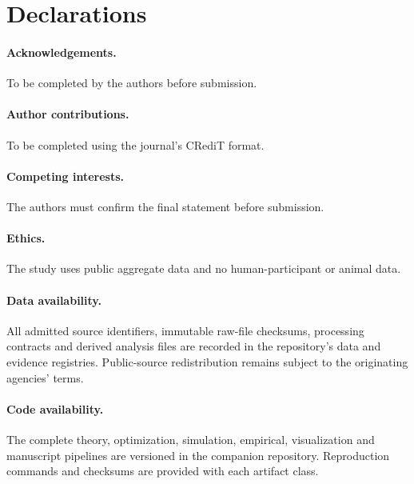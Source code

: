 \section*{Declarations}
\paragraph{Acknowledgements.} To be completed by the authors before submission.
\paragraph{Author contributions.} To be completed using the journal's CRediT format.
\paragraph{Competing interests.} The authors must confirm the final statement before submission.
\paragraph{Ethics.} The study uses public aggregate data and no human-participant or animal data.
\paragraph{Data availability.} All admitted source identifiers, immutable raw-file checksums, processing contracts and derived analysis files are recorded in the repository's data and evidence registries. Public-source redistribution remains subject to the originating agencies' terms.
\paragraph{Code availability.} The complete theory, optimization, simulation, empirical, visualization and manuscript pipelines are versioned in the companion repository. Reproduction commands and checksums are provided with each artifact class.
